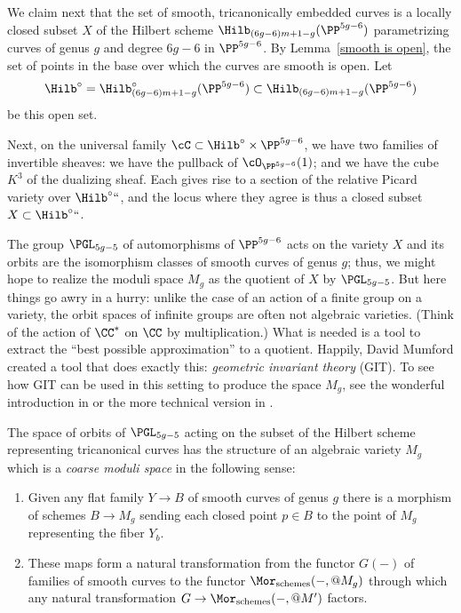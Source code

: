 We claim next that the set of smooth, tricanonically embedded curves
is a locally closed subset $X$ of the
Hilbert scheme
%
$\Hilb_{(6g-6)m+1-g}(\PP^{5g-6})$ parametrizing curves of genus $g$
and degree $6g-6$ in $\PP^{5g-6}$. By Lemma~\ref{smooth is open}, the
set of points in the base over which the curves are smooth is open. Let
$$
\Hilb^\circ = \Hilb^\circ_{(6g-6)m+1-g}(\PP^{5g-6})\subset \Hilb_{(6g-6)m+1-g}(\PP^{5g-6})
$$
be this open set.

Next, on the universal family
$\cC \subset \Hilb^\circ \times \PP^{5g-6}$,
we have two families of invertible sheaves: we have the
pullback of $\cO_{\PP^{5g-6}}(1)$; and we have the cube $K^3$ of the
dualizing sheaf. Each gives rise to a section of the relative
Picard variety
%
over $\Hilb^\circ` `$, and the locus where they agree is thus a
closed subset $X \subset \Hilb^\circ` `$.

The group $\PGL_{5g-5}$
of automorphisms of $\PP^{5g-6}$ acts on the variety $X$ and its orbits
%
are the isomorphism classes of smooth curves of genus $g$; thus, we might hope to realize the moduli space $M_g$ as the quotient of $X$ by $\PGL_{5g-5}$. But here things go awry in a hurry: unlike the case of an action of a finite group on a variety,
the orbit spaces of infinite groups are often not algebraic varieties.
(Think of the action of $\CC^*$ on $\CC$ by multiplication.) What is
needed is a tool to extract the ``best possible approximation'' to a
quotient. Happily, David Mumford created a tool that does exactly this:
\emph{geometric invariant theory}
%
%
(GIT).  To see how GIT can be
used in this  setting to produce the space $M_g$, see the wonderful
introduction in \cite{Mumford-Suominen}
or the more technical version in \cite{MR0450272}.

\begin{theorem}[Mumford]\label{unproved1}
The space of orbits of $\PGL_{5g-5}$ acting on the subset of the Hilbert scheme representing
tricanonical curves has the structure of an algebraic variety $M_g$ which is a \emph{coarse moduli
space} in the
%
following
sense:
\begin{enumerate}
 \item Given any flat family $Y\to B$ of smooth curves of genus $g$ there is a morphism of schemes
$B\to M_g$ sending each closed point $p\in B$ to the point of $M_g$
representing the fiber $Y\!_b$.
 \item These maps form a natural transformation from the functor $G(-)$ of families of smooth curves to the functor $\Mor_{\mathrm{ schemes}}(-,@ M_g)$
through which any natural transformation $G \to \Mor_{\mathrm{ schemes}}(-,@ M')$
 factors.
\end{enumerate}
\end{theorem}

